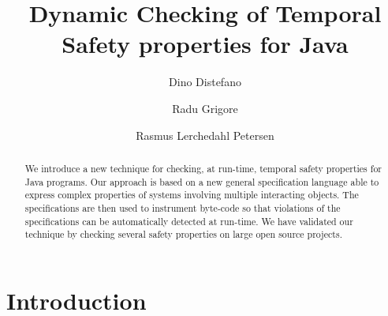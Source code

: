 \documentclass{llncs} %
\title{Dynamic Checking of Temporal Safety properties for Java}
\author{Dino Distefano \and Radu Grigore \and Rasmus Lerchedahl Petersen}
\institute{Queen Mary University of London }
\begin{document}
\maketitle

\begin{abstract} %
We introduce a new technique for checking, at run-time, temporal safety properties for Java programs.
Our approach is based on a new general specification language able to express complex properties of 
systems involving multiple interacting objects. The specifications are then used to instrument byte-code so that violations of the specifications can be automatically detected at run-time. 
We have validated our technique by checking several safety properties on large open source projects.
\end{abstract}


\section{Introduction} %
\end{document}
